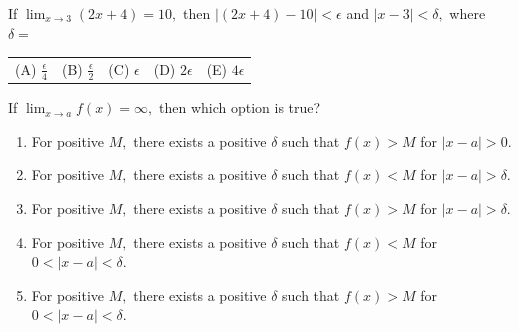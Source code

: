 \documentclass[letterstyle,12pt]{extarticle}
\newcounter{qcounter}
\newcommand{\choices}[5]{
\vspace{0.8em} 
\begin{enumerate}[label=(\Alph*)]
\setlength\itemsep{1em} 
\item
#1 
\item 
#2
\item
#3
\item
#4
\item
#5
\end{enumerate}
}
\newcommand{\choicesline}[5]{    
\vspace{2em} \break 
\begin{tabularx}{0.95 \textwidth} { 
>{\arraybackslash}X 
>{\arraybackslash}X 
>{\arraybackslash}X 
>{\arraybackslash}X 
>{\arraybackslash}X }
(A) \; #1
& 
(B) \; #2
& 
(C) \; #3
& 
(D) \; #4
&
(E) \; #5 
\end{tabularx}
\vspace{2em} \break
}
\newcommand{\ans}[1]{{\color{black} #1}}
\newenvironment{question}
    {\begin{minipage}{0.9 \textwidth}
        \item
    }
    { 
    \end{minipage} \vspace{4ex}
    }
\begin{document}
\begin{list}{\textbf{.}~}{}
\begin{question}
If \(\lim_{x \to 3} (2x + 4) = 10,\) then \(|(2x + 4) - 10| < \epsilon\) and \(|x - 3| < \delta,\) where \(\delta =\) \\
\choicesline
{\(\frac{\epsilon}{4}\)}
{\ans{\(\frac{\epsilon}{2}\)}}
{\(\epsilon\)}
{\(2 \epsilon\)}
{\(4 \epsilon\)}
\end{question}

\begin{question}
If \(\lim_{x \to a} f(x) = \infty,\) then which option is true?
\choices
{For positive \(M,\) there exists a positive \(\delta\) such that \(f(x) > M\) for \(|x - a| > 0.\)}
{For positive \(M,\) there exists a positive \(\delta\) such that \(f(x) < M\) for \(|x - a| > \delta.\)}
{For positive \(M,\) there exists a positive \(\delta\) such that \(f(x) > M\) for \(|x - a| > \delta.\)}
{For positive \(M,\) there exists a positive \(\delta\) such that \(f(x) < M\) for \(0 < |x - a| < \delta.\)}
{\ans{For positive \(M,\) there exists a positive \(\delta\) such that \(f(x) > M\) for \(0 < |x - a| < \delta.\)}}
\end{question}


\end{list}

\clearpage 

\twocolumn
\end{document}
